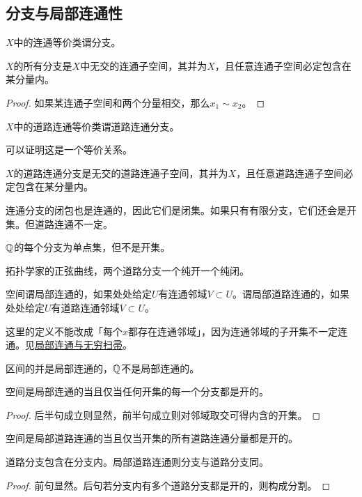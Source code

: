\documentclass{ctexrep}
\begin{document}
  \subsection{分支与局部连通性}
  \begin{definition}
    $X$中的连通等价类谓分支。
  \end{definition}
  \begin{theorem}
    $X$的所有分支是$X$中无交的连通子空间，其并为$X$，且任意连通子空间必定包含在某分量内。
  \end{theorem}
  \begin{proof}
    如果某连通子空间和两个分量相交，那么$x_1\sim x_2$。
  \end{proof}
  \begin{definition}
    $X$中的道路连通等价类谓道路连通分支。
  \end{definition}
  可以证明这是一个等价关系。
  \begin{theorem}
    $X$的道路连通分支是无交的道路连通子空间，其并为$X$，且任意道路连通子空间必定包含在某分量内。
  \end{theorem}
  连通分支的闭包也是连通的，因此它们是闭集。如果只有有限分支，它们还会是开集。但道路连通不一定。
  \begin{ex}
    $\mathbb{Q}$的每个分支为单点集，但不是开集。
  \end{ex}
  \begin{ex}
    拓扑学家的正弦曲线，两个道路分支一个纯开一个纯闭。
  \end{ex}
  \begin{definition}
    空间谓局部连通的，如果处处给定$U$有连通邻域$V\subset U$。谓局部道路连通的，如果处处给定$U$有道路连通邻域$V\subset U$。
  \end{definition}
  \begin{ex}
    这里的定义不能改成「每个$x$都存在连通邻域」，因为连通邻域的子开集不一定连通。见\href{https://math.stackexchange.com/questions/2439096/consider-the-infinite-broom}{局部连通与无穷扫帚}。
  \end{ex}
  \begin{ex}
    区间的并是局部连通的，$\mathbb{Q}$不是局部连通的。
  \end{ex}
  \begin{theorem}
    空间是局部连通的当且仅当任何开集的每一个分支都是开的。
  \end{theorem}
  \begin{proof}
    后半句成立则显然，前半句成立则对邻域取交可得内含的开集。
  \end{proof}
  \begin{theorem}
    空间是局部道路连通的当且仅当开集的所有道路连通分量都是开的。
  \end{theorem}
  \begin{theorem}
    道路分支包含在分支内。局部道路连通则分支与道路分支同。
  \end{theorem}
  \begin{proof}
    前句显然。后句若分支内有多个道路分支都是开的，则构成分割。
  \end{proof}
\end{document}
